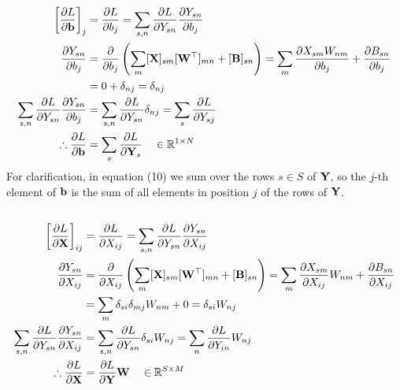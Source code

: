 \documentclass[a4paper]{article}
\begin{document}
\subsection{} %
\begin{align}
   \left[ \frac{\partial L}{\partial \mathbf{b}} \right]_{j} &= \frac{\partial L}{\partial b_{j}} = \sum_{s,n} \frac{\partial L}{\partial Y_{sn}} \frac{\partial Y_{sn}}{\partial b_{j}} \\
   \frac{\partial Y_{sn}}{\partial b_{j}} &= \frac{\partial}{\partial b_{j}} \left( \sum_{m} [\mathbf{X}]_{sm} [\mathbf{W}^\top]_{mn} + [\mathbf{B}]_{sn} \right) = \sum_m \frac{\partial X_{sm} W_{nm}}{\partial b_{j}} + \frac{\partial B_{sn}}{\partial b_{j}} \\
   &= 0 + \delta_{nj} = \delta_{nj} \\
   \sum_{s,n} \frac{\partial L}{\partial Y_{sn}} \frac{\partial Y_{sn}}{\partial b_{j}} &= \sum_{s,n} \frac{\partial L}{\partial Y_{sn}} \delta_{nj} = \sum_{s} \frac{\partial L}{\partial Y_{sj}} \\
   \therefore \frac{\partial L}{\partial \mathbf{b}} &= \sum_{s} \frac{\partial L}{\partial \mathbf{Y}_s} \quad \in \mathbb{R}^{1 \times N}
\end{align}
For clarification, in equation (10) we sum over the rows $s \in S$ of $\mathbf{Y}$, so the $j$-th element of $\mathbf{b}$ is the sum of all elements in position $j$ of the rows of $\mathbf{Y}$.

\subsection{} %
\begin{align}
   \left[ \frac{\partial L}{\partial \mathbf{X}} \right]_{ij} &= \frac{\partial L}{\partial X_{ij}} = \sum_{s,n} \frac{\partial L}{\partial Y_{sn}} \frac{\partial Y_{sn}}{\partial X_{ij}} \\
   \frac{\partial Y_{sn}}{\partial X_{ij}} &= \frac{\partial}{\partial X_{ij}} \left( \sum_{m} [\mathbf{X}]_{sm} [\mathbf{W}^\top]_{mn} + [\mathbf{B}]_{sn} \right) = \sum_m \frac{\partial X_{sm}}{\partial X_{ij}} W_{nm} + \frac{\partial B_{sn}}{\partial X_{ij}} \\
   &= \sum_m \delta_{si} \delta_{mj} W_{nm} + 0 = \delta_{si} W_{nj} \\
   \sum_{s,n} \frac{\partial L}{\partial Y_{sn}} \frac{\partial Y_{sn}}{\partial X_{ij}} &= \sum_{s,n} \frac{\partial L}{\partial Y_{sn}} \delta_{si} W_{nj} = \sum_{n} \frac{\partial L}{\partial Y_{in}} W_{nj} \\
   \therefore \frac{\partial L}{\partial \mathbf{X}} &= \frac{\partial L}{\partial \mathbf{Y}} \mathbf{W} \quad \in \mathbb{R}^{S \times M}
\end{align}
\end{document}
